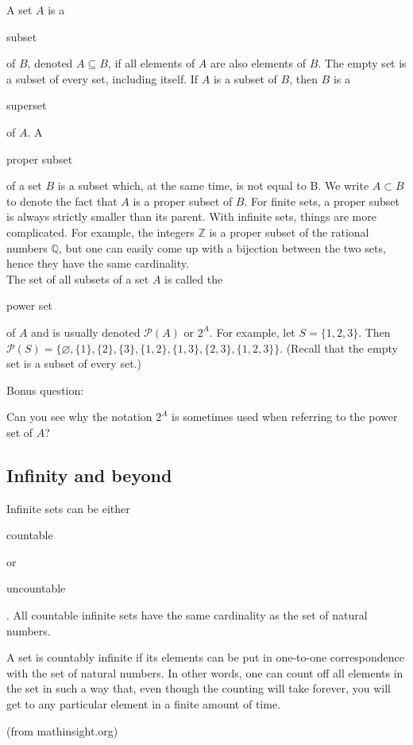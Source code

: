 \documentclass[11pt]{article}
\theoremstyle{plain}
\theoremstyle{definition}
\begin{document}
A set $ A $ is a \begin{em}subset\end{em} of $ B $, denoted $ A \subseteq B $, if all elements of $ A $ are also elements of $ B $. The empty set is a subset of every set, including itself. If $ A $ is a subset of $ B $, then $ B $ is a \begin{em}superset\end{em} of $ A $. A \begin{em}proper subset\end{em} of a set $ B $ is a subset which, at the same time, is not equal to B. We write $ A \subset B $ to denote the fact that $ A $ is a proper subset of $ B $. For finite sets, a proper subset is always strictly smaller than its parent. With infinite sets, things are more complicated. For example, the integers $ \mathbb{Z} $ is a proper subset of the rational numbers $ \mathbb{Q} $, but one can easily come up with a bijection between the two sets, hence they have the same cardinality. \\

\noindent The set of all subsets of a set $ A $ is called the \begin{em}power set\end{em} of $ A $ and is usually denoted $ \mathcal{P} (A) $ or $ 2^A $. For example, let $ S = \{ 1, 2, 3 \} $. Then $ \mathcal{P} (S) = \{ \varnothing, \{ 1 \}, \{ 2 \}, \{ 3 \}, \{ 1, 2\}, \{ 1, 3\}, \{ 2, 3\}, \{ 1, 2, 3 \} \} $. (Recall that the empty set is a subset of every set.) \begin{em}Bonus question:\end{em} Can you see why the notation $ 2^A $ is sometimes used when referring to the power set of $ A $? 

\subsection*{Infinity and beyond}

\noindent Infinite sets can be either \begin{em}countable\end{em} or \begin{em}uncountable\end{em}. All countable infinite sets have the same cardinality as the set of natural numbers. 

\begin{displayquote}\begin{em}
A set is countably infinite if its elements can be put in one-to-one correspondence with the set of natural numbers. In other words, one can count off all elements in the set in such a way that, even though the counting will take forever, you will get to any particular element in a finite amount of time.\end{em} (from mathinsight.org)
\end{displayquote}
\end{document}
